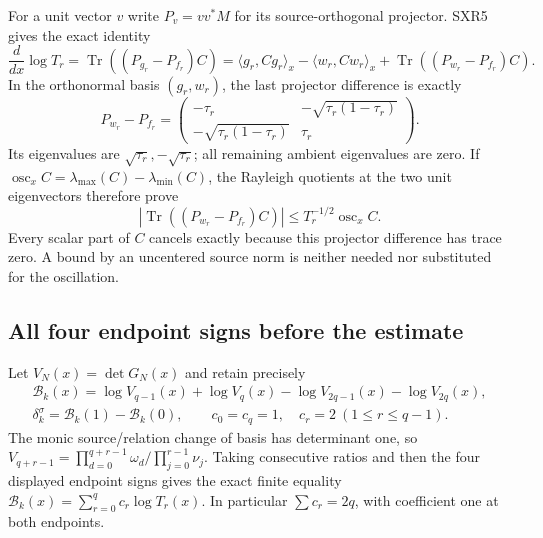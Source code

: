 For a unit vector $v$ write $P_v=vv^*M$ for its source-orthogonal
projector. SXR5 gives the exact identity
\begin{equation}\tag{SXR8}
 \frac{d}{dx}\log T_r
   =\operatorname{Tr}((P_{g_r}-P_{f_r})C)
   =\langle g_r,Cg_r\rangle_x-\langle w_r,Cw_r\rangle_x
      +\operatorname{Tr}((P_{w_r}-P_{f_r})C).
\end{equation}
In the orthonormal basis $(g_r,w_r)$, the last projector difference
is exactly
\[
 P_{w_r}-P_{f_r}=
 \begin{pmatrix}
 -\tau_r&-\sqrt{\tau_r(1-\tau_r)}\\
 -\sqrt{\tau_r(1-\tau_r)}&\tau_r
 \end{pmatrix}.
\]
Its eigenvalues are $\sqrt{\tau_r},-\sqrt{\tau_r}$; all remaining
ambient eigenvalues are zero. If
$\operatorname{osc}_x C=\lambda_{\max}(C)-\lambda_{\min}(C)$,
the Rayleigh quotients at the two unit eigenvectors therefore prove
\begin{equation}\tag{SXR9}
 |\operatorname{Tr}((P_{w_r}-P_{f_r})C)|
          \le T_r^{-1/2}\operatorname{osc}_x C.
\end{equation}
Every scalar part of $C$ cancels exactly because this projector
difference has trace zero. A bound by an uncentered source norm is
neither needed nor substituted for the oscillation.

\subsection{All four endpoint signs before the estimate}

Let $V_N(x)=\det G_N(x)$ and retain precisely
\begin{equation}\tag{SXR10}
\begin{gathered}
 \mathcal B_k(x)=\log V_{q-1}(x)+\log V_q(x)
                     -\log V_{2q-1}(x)-\log V_{2q}(x),\\
 \delta_k^\sigma=\mathcal B_k(1)-\mathcal B_k(0),\qquad
 c_0=c_q=1,\quad c_r=2\ (1\le r\le q-1).
\end{gathered}
\end{equation}
The monic source/relation change of basis has determinant one, so
$V_{q+r-1}=\prod_{d=0}^{q+r-1}\omega_d/\prod_{j=0}^{r-1}\nu_j$.
Taking consecutive ratios and then the four displayed endpoint signs
gives the exact finite equality
$\mathcal B_k(x)=\sum_{r=0}^q c_r\log T_r(x)$.
In particular $\sum c_r=2q$, with coefficient one at both endpoints.

